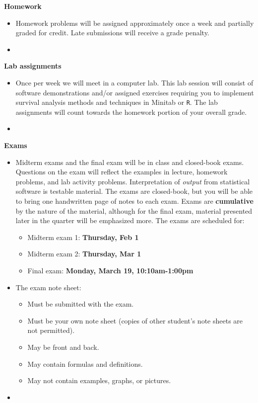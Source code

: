 \documentclass[letterpaper,12pt]{report}
\begin{document}
\textbf{Homework}
\begin{itemize}
\item[]
Homework problems will be assigned approximately once a week and partially graded for credit. Late submissions will receive a grade penalty.
\item[]
\end{itemize}

\textbf{Lab assignments}
\begin{itemize}
\item[]
Once per week we will meet in a computer lab.  This lab session will consist of software demonstrations and/or assigned exercises requiring you to implement survival analysis methods and techniques in Minitab or \texttt{R}. The lab assignments will count towards the homework portion of your overall grade.
\item[]
\end{itemize}


\textbf{Exams}
\begin{itemize}
\item[]
Midterm exams and the final exam will be in class and closed-book exams.  Questions on the exam will reflect the examples in lecture, homework problems, and lab activity problems.  Interpretation of \emph{output} from statistical software is testable material.  The exams are closed-book, but you will be able to bring one handwritten page of notes to each exam.  Exams are \textbf{cumulative} by the nature of the material, although for the final exam, material presented later in the quarter will be emphasized more.  The exams are scheduled for:
\begin{itemize}
\item Midterm exam 1: \textbf{Thursday, Feb 1}
\item Midterm exam 2: \textbf{Thursday, Mar 1}
\item Final exam: \textbf{Monday, March 19, 10:10am-1:00pm}
\end{itemize}
\item[]
The exam note sheet:
\begin{itemize}
\item Must be submitted with the exam.
\item Must be your own note sheet (copies of other student's note sheets are not permitted).
\item May be front and back.
\item May contain formulas and definitions.
\item May not contain examples, graphs, or pictures.
\end{itemize}
\item[]
\end{itemize}
\end{document}
